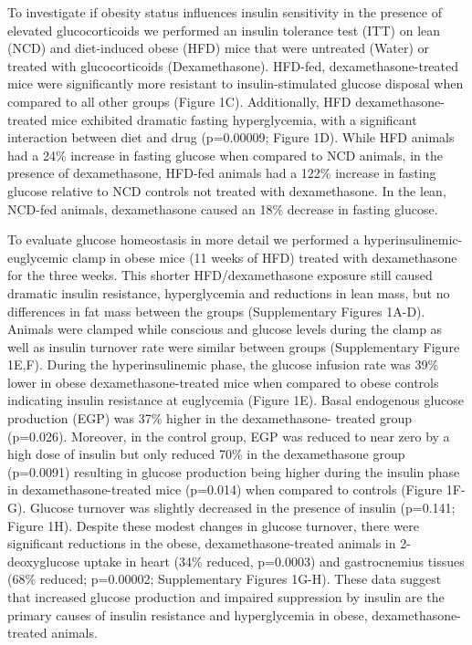 \documentclass[11pt]{article} %
\begin{document}
To investigate if obesity status influences insulin sensitivity in the
presence of elevated glucocorticoids we performed an insulin tolerance
test (ITT) on lean (NCD) and diet-induced obese (HFD) mice that were
untreated (Water) or treated with glucocorticoids (Dexamethasone).
HFD-fed, dexamethasone-treated mice were significantly more resistant to
insulin-stimulated glucose disposal when compared to all other groups
(Figure 1C). Additionally, HFD dexamethasone-treated mice exhibited
dramatic fasting hyperglycemia, with a significant interaction between
diet and drug (p=0.00009; Figure 1D). While HFD animals had a 24\%
increase in fasting glucose when compared to NCD animals, in the
presence of dexamethasone, HFD-fed animals had a 122\% increase in
fasting glucose relative to NCD controls not treated with dexamethasone.
In the lean, NCD-fed animals, dexamethasone caused an 18\% decrease in
fasting glucose.

To evaluate glucose homeostasis in more detail we performed a
hyperinsulinemic-euglycemic clamp in obese mice (11 weeks of HFD)
treated with dexamethasone for the three weeks. This shorter
HFD/dexamethasone exposure still caused dramatic insulin resistance,
hyperglycemia and reductions in lean mass, but no differences in fat
mass between the groups (Supplementary Figures 1A-D). Animals were
clamped while conscious and glucose levels during the clamp as well as
insulin turnover rate were similar between groups (Supplementary Figure
1E,F). During the hyperinsulinemic phase, the glucose infusion rate was
39\% lower in obese dexamethasone-treated mice when compared to obese
controls indicating insulin resistance at euglycemia (Figure 1E). Basal
endogenous glucose production (EGP) was 37\% higher in the
dexamethasone- treated group (p=0.026). Moreover, in the control group,
EGP was reduced to near zero by a high dose of insulin but only reduced
70\% in the dexamethasone group (p=0.0091) resulting in glucose
production being higher during the insulin phase in
dexamethasone-treated mice (p=0.014) when compared to controls (Figure
1F-G). Glucose turnover was slightly decreased in the presence of
insulin (p=0.141; Figure 1H). Despite these modest changes in glucose
turnover, there were significant reductions in the obese,
dexamethasone-treated animals in 2-deoxyglucose uptake in heart (34\%
reduced, p=0.0003) and gastrocnemius tissues (68\% reduced; p=0.00002;
Supplementary Figures 1G-H). These data suggest that increased glucose
production and impaired suppression by insulin are the primary causes of
insulin resistance and hyperglycemia in obese, dexamethasone-treated
animals.
\end{document}
